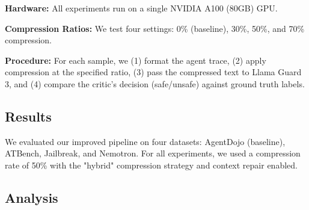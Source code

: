\documentclass[11pt]{article}
\begin{document}
\noindent \textbf{Hardware:} All experiments run on a single NVIDIA A100 (80GB) GPU. \newline

\noindent \textbf{Compression Ratios:} We test four settings: 0\% (baseline), 30\%, 50\%, and 70\% compression.  \newline

\noindent \textbf{Procedure:} For each sample, we (1) format the agent trace, (2) apply compression at the specified ratio, (3) pass the compressed text to Llama Guard 3, and (4) compare the critic's decision (safe/unsafe) against ground truth labels.

\subsection{Results}

We evaluated our improved pipeline on four datasets: AgentDojo (baseline), ATBench, Jailbreak, and Nemotron. For all experiments, we used a compression rate of 50\% with the "hybrid" compression strategy and context repair enabled.

\begin{table}[h]
\centering
{}
\caption{Performance metrics across different datasets (limit=10 samples each).}
\label{tab:results}
\end{table}

\subsection{Analysis}
\end{document}
